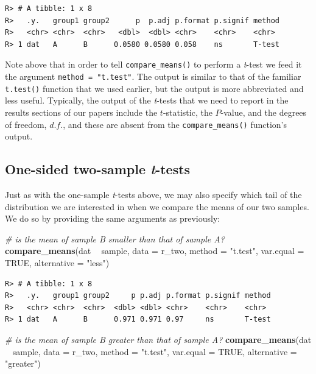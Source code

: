 \documentclass[english,10pt,a4paper,oneside]{book}
\newenvironment{Shaded}{\begin{snugshade}}{\end{snugshade}}
\newcommand{\KeywordTok}[1]{\textcolor[rgb]{0.13,0.29,0.53}{\textbf{#1}}}
\newcommand{\DataTypeTok}[1]{\textcolor[rgb]{0.13,0.29,0.53}{#1}}
\newcommand{\StringTok}[1]{\textcolor[rgb]{0.31,0.60,0.02}{#1}}
\newcommand{\CommentTok}[1]{\textcolor[rgb]{0.56,0.35,0.01}{\textit{#1}}}
\newcommand{\OtherTok}[1]{\textcolor[rgb]{0.56,0.35,0.01}{#1}}
\newcommand{\OperatorTok}[1]{\textcolor[rgb]{0.81,0.36,0.00}{\textbf{#1}}}
\newcommand{\NormalTok}[1]{#1}
\theoremstyle{definition}
\theoremstyle{definition}
\theoremstyle{definition}
\theoremstyle{remark}
\begin{document}
\begin{verbatim}
R> # A tibble: 1 x 8
R>   .y.   group1 group2      p  p.adj p.format p.signif method
R>   <chr> <chr>  <chr>   <dbl>  <dbl> <chr>    <chr>    <chr> 
R> 1 dat   A      B      0.0580 0.0580 0.058    ns       T-test
\end{verbatim}

Note above that in order to tell \texttt{compare\_means()} to perform a
\emph{t}-test we feed it the argument \texttt{method\ =\ "t.test"}. The
output is similar to that of the familiar \texttt{t.test()} function
that we used earlier, but the output is more abbreviated and less
useful. Typically, the output of the \emph{t}-tests that we need to
report in the results sections of our papers include the
\(t\)-statistic, the \(P\)-value, and the degrees of freedom, \(d.f.\),
and these are absent from the \texttt{compare\_means()} function's
output.

\subsection{\texorpdfstring{One-sided two-sample
\emph{t}-tests}{One-sided two-sample t-tests}}\label{one-sided-two-sample-t-tests}

Just as with the one-sample \emph{t}-tests above, we may also specify
which tail of the distribution we are interested in when we compare the
means of our two samples. We do so by providing the same arguments as
previously:

\begin{Shaded}
\begin{Highlighting}[]
\CommentTok{# is the mean of sample B smaller than that of sample A?}
\KeywordTok{compare_means}\NormalTok{(dat }\OperatorTok{~}\StringTok{ }\NormalTok{sample, }\DataTypeTok{data =}\NormalTok{ r_two, }\DataTypeTok{method =} \StringTok{"t.test"}\NormalTok{, }\DataTypeTok{var.equal =} \OtherTok{TRUE}\NormalTok{, }\DataTypeTok{alternative =} \StringTok{"less"}\NormalTok{)}
\end{Highlighting}
\end{Shaded}

\begin{verbatim}
R> # A tibble: 1 x 8
R>   .y.   group1 group2     p p.adj p.format p.signif method
R>   <chr> <chr>  <chr>  <dbl> <dbl> <chr>    <chr>    <chr> 
R> 1 dat   A      B      0.971 0.971 0.97     ns       T-test
\end{verbatim}

\begin{Shaded}
\begin{Highlighting}[]
\CommentTok{# is the mean of sample B greater than that of sample A?}
\KeywordTok{compare_means}\NormalTok{(dat }\OperatorTok{~}\StringTok{ }\NormalTok{sample, }\DataTypeTok{data =}\NormalTok{ r_two, }\DataTypeTok{method =} \StringTok{"t.test"}\NormalTok{, }\DataTypeTok{var.equal =} \OtherTok{TRUE}\NormalTok{, }\DataTypeTok{alternative =} \StringTok{"greater"}\NormalTok{)}
\end{Highlighting}
\end{Shaded}
\end{document}
